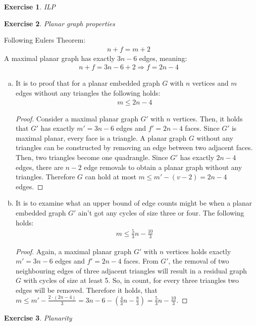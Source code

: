 \documentclass[a4paper,12pt,headsepline]{scrartcl}
\newtheorem{aufgabe}{Exercise}
\begin{document}
\begin{aufgabe}ILP
\end{aufgabe}
\newpage
\begin{aufgabe}Planar graph properties
\end{aufgabe}
Following Eulers Theorem:
\begin{align*}
n + f = m + 2
\end{align*}
A maximal planar graph has exactly $3n-6$ edges, meaning:
\begin{align*}
n + f = 3n-6 + 2   \Rightarrow f = 2n-4
\end{align*}
\begin{enumerate}[a)]
	\item It is to proof that for a planar embedded graph $G$ with $n$ vertices and $m$ edges without any triangles the following holds:
	\begin{align*}
		m \leq 2n-4
	\end{align*}
	\begin{proof}
		Consider a maximal planar graph $G'$ with $n$ vertices. Then, it holds that $G'$ has exactly $m' = 3n-6$ edges and $f' = 2n-4$ faces. Since $G'$ is maximal planar, every face is a triangle. A planar graph $G$ without any triangles can be constructed by removing an edge between two adjacent faces. Then, two triangles become one quadrangle. Since $G'$ has exactly $2n-4$ edges, there are $n-2$ edge removals to obtain a planar graph without any triangles. Therefore $G$ can hold at most $m \leq m' - (v-2) = 2n -4$ edges.
	\end{proof}
	\item It is to examine what an upper bound of edge counts might be when a planar embedded graph $G'$ ain't got any cycles of size three or four. The following holds:
	\begin{align*}
		m \leq \frac{5}{3}n - \frac{10}{3}
	\end{align*}
	\begin{proof}
		Again, a maximal planar graph $G'$ with $n$ vertices holds exactly $m' = 3n-6$ edges and $f' = 2n-4$ faces. From $G'$, the removal of two neighbouring edges of three adjacent triangles will result in a residual graph $G$ with cycles of size at least 5. So, in count, for every three triangles two edges will be removed. Therefore it holds, that $m \leq m' - \frac{2\cdot (2n-4)}{3} = 3n-6 - (\frac{4}{3}n - \frac{8}{3}) = \frac{5}{3}n - \frac{10}{3}$.
	\end{proof}
\end{enumerate}
\newpage
\begin{aufgabe}Planarity
\end{aufgabe}
\end{document}
